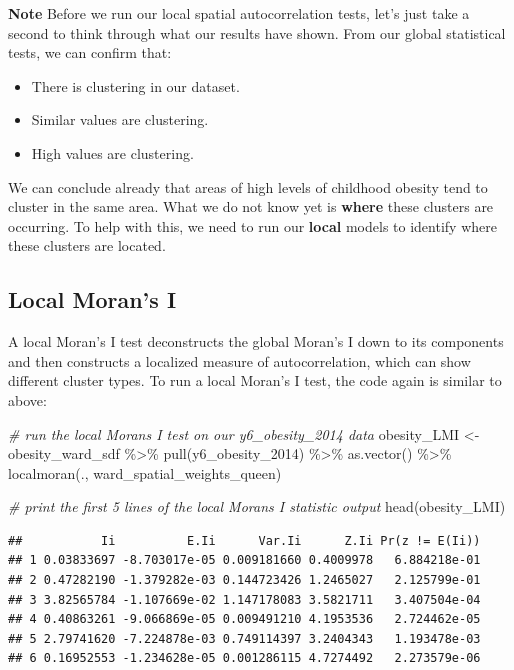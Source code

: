 \documentclass[
]{book}
\newenvironment{Shaded}{\begin{snugshade}}{\end{snugshade}}
\newcommand{\CommentTok}[1]{\textcolor[rgb]{0.56,0.35,0.01}{\textit{#1}}}
\newcommand{\FunctionTok}[1]{\textcolor[rgb]{0.00,0.00,0.00}{#1}}
\newcommand{\NormalTok}[1]{#1}
\newcommand{\OtherTok}[1]{\textcolor[rgb]{0.56,0.35,0.01}{#1}}
\newcommand{\SpecialCharTok}[1]{\textcolor[rgb]{0.00,0.00,0.00}{#1}}
\providecommand{\tightlist}{%
  \setlength{\itemsep}{0pt}\setlength{\parskip}{0pt}}
\begin{document}
\textbf{Note}
Before we run our local spatial autocorrelation tests, let's just take a second to think through what our results have shown. From our global statistical tests, we can confirm that:

\begin{itemize}
\tightlist
\item
  There is clustering in our dataset.
\item
  Similar values are clustering.
\item
  High values are clustering.
\end{itemize}

We can conclude already that areas of high levels of childhood obesity tend to cluster in the same area. What we do not know yet is \textbf{where} these clusters are occurring. To help with this, we need to run our \textbf{local} models to identify where these clusters are located.

\hypertarget{local-morans-i}{%
\subsection{Local Moran's I}\label{local-morans-i}}

A local Moran's I test deconstructs the global Moran's I down to its components and then constructs a localized measure of autocorrelation, which can show different cluster types. To run a local Moran's I test, the code again is similar to above:

\begin{Shaded}
\begin{Highlighting}[]
\CommentTok{\# run the local Moran\textquotesingle{}s I test on our y6\_obesity\_2014 data}
\NormalTok{obesity\_LMI }\OtherTok{\textless{}{-}}\NormalTok{ obesity\_ward\_sdf }\SpecialCharTok{\%\textgreater{}\%}
    \FunctionTok{pull}\NormalTok{(y6\_obesity\_2014) }\SpecialCharTok{\%\textgreater{}\%}
    \FunctionTok{as.vector}\NormalTok{() }\SpecialCharTok{\%\textgreater{}\%}
    \FunctionTok{localmoran}\NormalTok{(., ward\_spatial\_weights\_queen)}

\CommentTok{\# print the first 5 lines of the local Moran\textquotesingle{}s I statistic output}
\FunctionTok{head}\NormalTok{(obesity\_LMI)}
\end{Highlighting}
\end{Shaded}

\begin{verbatim}
##           Ii          E.Ii      Var.Ii      Z.Ii Pr(z != E(Ii))
## 1 0.03833697 -8.703017e-05 0.009181660 0.4009978   6.884218e-01
## 2 0.47282190 -1.379282e-03 0.144723426 1.2465027   2.125799e-01
## 3 3.82565784 -1.107669e-02 1.147178083 3.5821711   3.407504e-04
## 4 0.40863261 -9.066869e-05 0.009491210 4.1953536   2.724462e-05
## 5 2.79741620 -7.224878e-03 0.749114397 3.2404343   1.193478e-03
## 6 0.16952553 -1.234628e-05 0.001286115 4.7274492   2.273579e-06
\end{verbatim}
\end{document}
